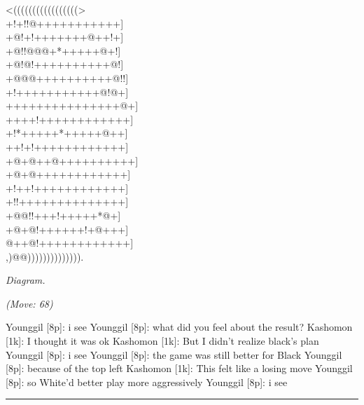 \documentclass[letterpaper,12pt]{memoir}
\newcounter{GoFigure}[part]
\newcommand{\gofigure}{%
 \stepcounter{GoFigure}
 \centerline{\textit{Diagram.\thinspace\arabic{GoFigure}}}
}
\newcommand{\subtext}[1]{\centerline{\textit{#1}}}
\begin{document}
\begin{minipage}[t]{240pt}
{\gnos
<(((((((((((((((((>\\
+!+!!@+++++++++++]\\
+@!+!+++++++@++!+]\\
+@!!@@@+*+++++@+!]\\
+@!@!++++++++++@!]\\
+@@@++++++++++@!!]\\
+!+++++++++++@!@+]\\
+++++++++++++++@+]\\
++++!++++++++++++]\\
+!*+++++*+++++@++]\\
++!+!++++++++++++]\\
+@+@++@++++++++++]\\
+@+@++++++++++++]\\
+!++!++++++++++++]\\
+!!++++++++++++++]\\
+@@!!+++!+++++*@+]\\
+@+@!++++++!+@+++]\\
@++@!++++++++++++]\\
,)@@)))))))))))))).\\
}
\gofigure

\subtext{(Move: 68)}
\end{minipage}
\begin{minipage}[t]{268.19999999999993pt}
\setlength{\parskip}{0.5em}
Younggil [8p]: i see
Younggil [8p]: what did you feel about the result?
Kashomon [1k]: I thought it was ok
Kashomon [1k]: But I didn't realize black's plan
Younggil [8p]: i see
Younggil [8p]: the game was still better for Black
Younggil [8p]: because of the top left
Kashomon [1k]: This felt like a losing move
Younggil [8p]: so White'd better play more aggressively
Younggil [8p]: i see


\end{minipage}
\vfill

\rule{\textwidth}{0.5pt}
\end{document}
